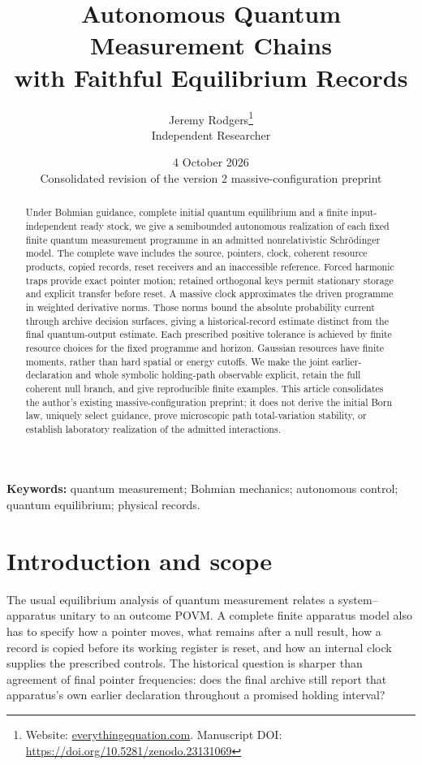\documentclass[11pt]{article}
\title{\bfseries Autonomous Quantum Measurement Chains\\with Faithful Equilibrium Records}
\author{Jeremy Rodgers\thanks{Website: \href{https://everythingequation.com}{everythingequation.com}. Manuscript DOI: \url{https://doi.org/10.5281/zenodo.23131069}}\\\small Independent Researcher}
\date{4 October 2026\\[2mm]\small Consolidated revision of the version 2 massive-configuration preprint}
\theoremstyle{definition}\newtheorem{assumption}[theorem]{Constitutive assumption}
\theoremstyle{remark}\newtheorem{remark}[theorem]{Remark}
\begin{document}
\maketitle
\begin{abstract}
Under Bohmian guidance, complete initial quantum equilibrium and a finite input-independent ready stock, we give a semibounded autonomous realization of each fixed finite quantum measurement programme in an admitted nonrelativistic Schr\"odinger model. The complete wave includes the source, pointers, clock, coherent resource products, copied records, reset receivers and an inaccessible reference. Forced harmonic traps provide exact pointer motion; retained orthogonal keys permit stationary storage and explicit transfer before reset. A massive clock approximates the driven programme in weighted derivative norms. Those norms bound the absolute probability current through archive decision surfaces, giving a historical-record estimate distinct from the final quantum-output estimate. Each prescribed positive tolerance is achieved by finite resource choices for the fixed programme and horizon. Gaussian resources have finite moments, rather than hard spatial or energy cutoffs. We make the joint earlier-declaration and whole symbolic holding-path observable explicit, retain the full coherent null branch, and give reproducible finite examples. This article consolidates the author's existing massive-configuration preprint; it does not derive the initial Born law, uniquely select guidance, prove microscopic path total-variation stability, or establish laboratory realization of the admitted interactions.
\end{abstract}

\noindent\textbf{Keywords:} quantum measurement; Bohmian mechanics; autonomous control; quantum equilibrium; physical records.

\section{Introduction and scope}
\label{sec:frontier}
The usual equilibrium analysis of quantum measurement relates a system--apparatus unitary to an outcome POVM. A complete finite apparatus model also has to specify how a pointer moves, what remains after a null result, how a record is copied before its working register is reset, and how an internal clock supplies the prescribed controls. The historical question is sharper than agreement of final pointer frequencies: does the final archive still report that apparatus's own earlier declaration throughout a promised holding interval?
\end{document}
